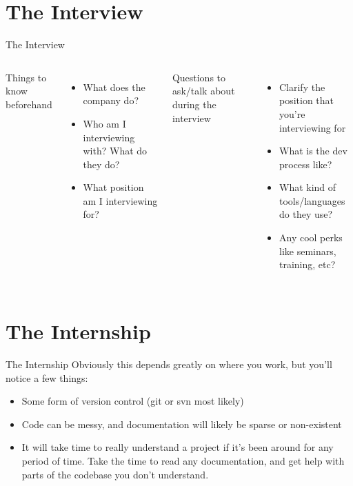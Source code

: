 \documentclass{beamer}
\begin{document}
\section{The Interview}
\begin{frame}{The Interview}
  \begin{columns}[t]
    Things to know beforehand
    \begin{itemize}
      \item What does the company do?
      \item Who am I interviewing with? What do they do?
      \item What position am I interviewing for?
    \end{itemize}
    Questions to ask/talk about during the interview
    \begin{itemize}
      \item Clarify the position that you're interviewing for
      \item What is the dev process like?
      \item What kind of tools/languages do they use?
      \item Any cool perks like seminars, training, etc?
    \end{itemize}
    \end{columns}

\end{frame}

\section{The Internship}
\begin{frame}{The Internship}
Obviously this depends greatly on where you work, but you'll notice a few things:
\begin{itemize}
  \item Some form of version control (git or svn most likely)
  \item Code can be messy, and documentation will likely be sparse or
        non-existent
  \item It will take time to really understand a project if it's been around for
        any period of time. Take the time to read any documentation, and get
        help with parts of the codebase you don't understand.

\end{itemize}

\end{frame}
\end{document}
